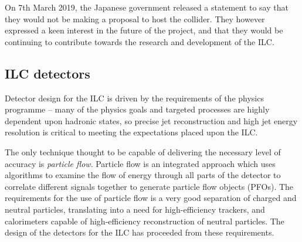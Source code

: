 On 7th March 2019, the Japanese government released a statement to say that they would not be making a proposal to host the collider\cite{japan-ilc-decision}. They however expressed a keen interest in the future of the project, and that they would be continuing to contribute towards the research and development of the \acrshort{ILC}.

\subsection{ILC detectors}
\label{section:ILC-detectors}
Detector design for the \acrshort{ILC} is driven by the requirements of the physics programme -- many of the physics goals and targeted processes are highly dependent upon hadronic states, so precise jet reconstruction and high jet energy resolution is critical to meeting the expectations placed upon the \acrshort{ILC}. 

The only technique thought to be capable of delivering the necessary level of accuracy is \textit{particle flow}. Particle flow is an integrated approach which uses algorithms to examine the flow of energy through all parts of the detector to correlate different signals together to generate particle flow objects (\acrshort{PFO}s). The requirements for the use of particle flow is a very good separation of charged and neutral particles, translating into a need for high-efficiency trackers, and calorimeters capable of high-efficiency reconstruction of neutral particles. The design of the detectors for the \acrshort{ILC} has proceeded from these requirements.


